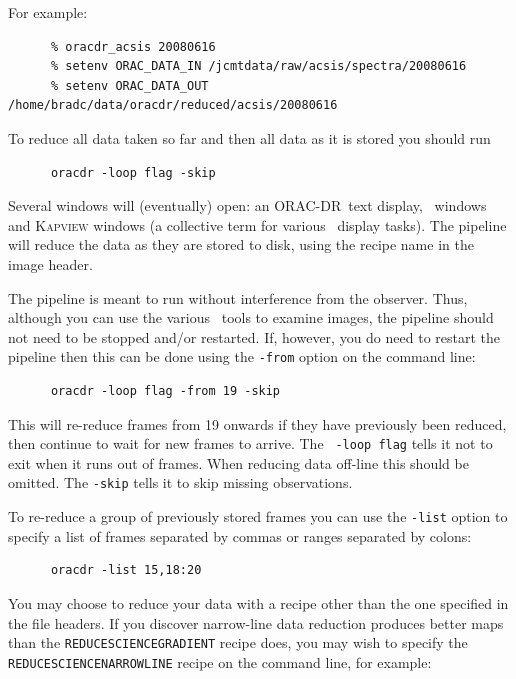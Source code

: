 \documentclass[twoside,11pt]{article}
\newcommand{\xref}[3]{#1}
\renewcommand{\_}{\texttt{\symbol{95}}}
\newcommand{\GAIA}{\xref{{\sc{Gaia}}}{sun214}{}}
\newcommand{\KAPPA}{\xref{{\sc{Kappa}}}{sun95}{}}
\newcommand{\ORACDR}{{\footnotesize ORAC-DR}}
\begin{document}
For example:

\begin{verbatim}
      % oracdr_acsis 20080616
      % setenv ORAC_DATA_IN /jcmtdata/raw/acsis/spectra/20080616
      % setenv ORAC_DATA_OUT /home/bradc/data/oracdr/reduced/acsis/20080616
\end{verbatim}

To reduce all data taken so far and then all data as it is stored you
should run

\begin{verbatim}
      oracdr -loop flag -skip
\end{verbatim}

Several windows will (eventually) open: an \ORACDR\ text display, \GAIA\
windows and \textsc{Kapview} windows (a collective term for various
\KAPPA\ display tasks). The pipeline will reduce the data as they
are stored to disk, using the recipe name in the image header.

The pipeline is meant to run without interference from the observer.
Thus, although you can use the various \GAIA\ tools to examine images,
the pipeline should not need to be stopped and/or restarted. If,
however, you do need to restart the pipeline then this can be done
using the {\tt -from} option on the command line:

\begin{verbatim}
      oracdr -loop flag -from 19 -skip
\end{verbatim}

This will re-reduce frames from 19 onwards if they have previously
been reduced, then continue to wait for new frames to arrive. The {\tt
  -loop flag} tells it not to exit when it runs out of frames. When
reducing data off-line this should be omitted. The {\tt -skip} tells it to
skip missing observations.

To re-reduce a group of
previously stored frames you can use the {\tt -list} option to specify
a list of frames separated by commas or ranges separated by colons:

\begin{verbatim}
      oracdr -list 15,18:20
\end{verbatim}

You may choose to reduce your data with a recipe other than the one specified
in the file headers. If you discover narrow-line data reduction produces
better maps than the {\tt REDUCE\_SCIENCE\_GRADIENT} recipe does, you may wish
to specify the {\tt REDUCE\_SCIENCE\_NARROWLINE} recipe on the command line,
for example:
\end{document}
